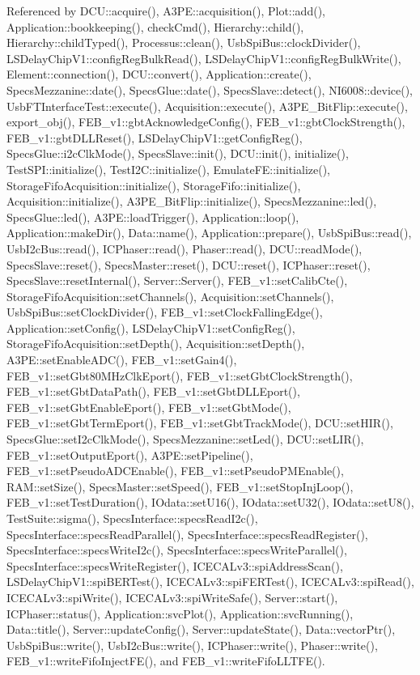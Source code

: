 Referenced by DCU::acquire(), A3PE::acquisition(), Plot::add(), Application::bookkeeping(), checkCmd(), Hierarchy::child(), Hierarchy::childTyped(), Processus::clean(), UsbSpiBus::clockDivider(), LSDelayChipV1::configRegBulkRead(), LSDelayChipV1::configRegBulkWrite(), Element::connection(), DCU::convert(), Application::create(), SpecsMezzanine::date(), SpecsGlue::date(), SpecsSlave::detect(), NI6008::device(), UsbFTInterfaceTest::execute(), Acquisition::execute(), A3PE\_\-BitFlip::execute(), export\_\-obj(), FEB\_\-v1::gbtAcknowledgeConfig(), FEB\_\-v1::gbtClockStrength(), FEB\_\-v1::gbtDLLReset(), LSDelayChipV1::getConfigReg(), SpecsGlue::i2cClkMode(), SpecsSlave::init(), DCU::init(), initialize(), TestSPI::initialize(), TestI2C::initialize(), EmulateFE::initialize(), StorageFifoAcquisition::initialize(), StorageFifo::initialize(), Acquisition::initialize(), A3PE\_\-BitFlip::initialize(), SpecsMezzanine::led(), SpecsGlue::led(), A3PE::loadTrigger(), Application::loop(), Application::makeDir(), Data::name(), Application::prepare(), UsbSpiBus::read(), UsbI2cBus::read(), ICPhaser::read(), Phaser::read(), DCU::readMode(), SpecsSlave::reset(), SpecsMaster::reset(), DCU::reset(), ICPhaser::reset(), SpecsSlave::resetInternal(), Server::Server(), FEB\_\-v1::setCalibCte(), StorageFifoAcquisition::setChannels(), Acquisition::setChannels(), UsbSpiBus::setClockDivider(), FEB\_\-v1::setClockFallingEdge(), Application::setConfig(), LSDelayChipV1::setConfigReg(), StorageFifoAcquisition::setDepth(), Acquisition::setDepth(), A3PE::setEnableADC(), FEB\_\-v1::setGain4(), FEB\_\-v1::setGbt80MHzClkEport(), FEB\_\-v1::setGbtClockStrength(), FEB\_\-v1::setGbtDataPath(), FEB\_\-v1::setGbtDLLEport(), FEB\_\-v1::setGbtEnableEport(), FEB\_\-v1::setGbtMode(), FEB\_\-v1::setGbtTermEport(), FEB\_\-v1::setGbtTrackMode(), DCU::setHIR(), SpecsGlue::setI2cClkMode(), SpecsMezzanine::setLed(), DCU::setLIR(), FEB\_\-v1::setOutputEport(), A3PE::setPipeline(), FEB\_\-v1::setPseudoADCEnable(), FEB\_\-v1::setPseudoPMEnable(), RAM::setSize(), SpecsMaster::setSpeed(), FEB\_\-v1::setStopInjLoop(), FEB\_\-v1::setTestDuration(), IOdata::setU16(), IOdata::setU32(), IOdata::setU8(), TestSuite::sigma(), SpecsInterface::specsReadI2c(), SpecsInterface::specsReadParallel(), SpecsInterface::specsReadRegister(), SpecsInterface::specsWriteI2c(), SpecsInterface::specsWriteParallel(), SpecsInterface::specsWriteRegister(), ICECALv3::spiAddressScan(), LSDelayChipV1::spiBERTest(), ICECALv3::spiFERTest(), ICECALv3::spiRead(), ICECALv3::spiWrite(), ICECALv3::spiWriteSafe(), Server::start(), ICPhaser::status(), Application::svcPlot(), Application::svcRunning(), Data::title(), Server::updateConfig(), Server::updateState(), Data::vectorPtr(), UsbSpiBus::write(), UsbI2cBus::write(), ICPhaser::write(), Phaser::write(), FEB\_\-v1::writeFifoInjectFE(), and FEB\_\-v1::writeFifoLLTFE().


